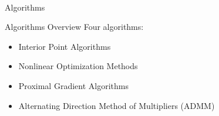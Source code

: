 

\begin{frame}{~}
    \begin{center}
        \huge{Algorithms}
    \end{center}
\end{frame}{}

\begin{frame}{Algorithms Overview}
    Four algorithms:
    \begin{itemize}
        \item Interior Point Algorithms
        \item Nonlinear Optimization Methods
        \item Proximal Gradient Algorithms
        \item Alternating Direction Method of Multipliers (ADMM)
    \end{itemize}
\end{frame}{}

